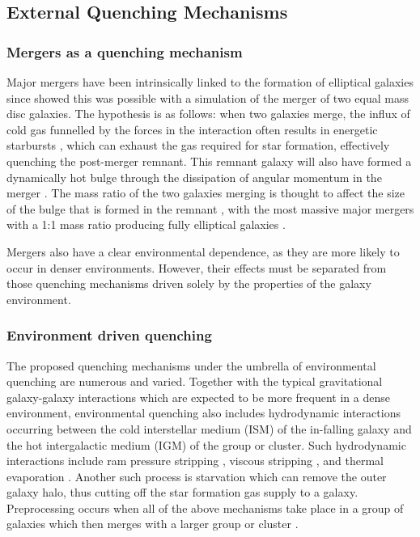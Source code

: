 \documentclass[useAMS,usenatbib]{mn2e}
\begin{document}
\subsection{External Quenching Mechanisms}\label{sec:extquench}

\subsubsection{Mergers as a quenching mechanism}\label{sec:mergersquench}

Major mergers have been intrinsically linked to the formation of elliptical galaxies since \citet{toomre72} showed this was possible with a simulation of the merger of two equal mass disc galaxies. The hypothesis is as follows: when two galaxies merge, the influx of cold gas funnelled by the forces in the interaction often results in energetic starbursts \citep{mihos94, mihos96, hopkins06d, hopkins08a, hopkins08b, snyder11, hayward14, sparre16}, which can exhaust the gas required for star formation, effectively quenching the post-merger remnant. This remnant galaxy will also have formed a dynamically hot bulge through the dissipation of angular momentum in the merger \citep{toomre77, walker96, kormendy04, hopkins11c, martig12}. The mass ratio of the two galaxies merging is thought to affect the size of the bulge that is formed in the remnant \citep{cox08, hopkins09c, tonini16}, with the most massive major mergers with a 1:1 mass ratio producing fully elliptical galaxies \citep{toomre72, barnes96, mihos96, kauffmann96, pontzen16}.

Mergers also have a clear environmental dependence, as they are more likely to occur in denser environments. However, their effects must be separated from those quenching mechanisms driven solely by the properties of the galaxy environment. 

\subsubsection{Environment driven quenching}\label{sec:envquench}

The proposed quenching mechanisms under the umbrella of environmental quenching are numerous and varied. Together with the typical gravitational galaxy-galaxy interactions \citep{moore96} which are expected to be more frequent in a dense environment, environmental quenching also includes hydrodynamic interactions occurring between the cold interstellar medium (ISM) of the in-falling galaxy and the hot intergalactic medium (IGM) of the group or cluster. Such hydrodynamic interactions include ram pressure stripping \citep{gunngott72}, viscous stripping \citep{nulsen82}, and thermal evaporation \citep[a rapid rise in temperature of the ISM due to contact with the IGM;][]{cowie77}. Another such process is starvation \citep[also called strangulation;][]{larson80} which can remove the outer galaxy halo, thus cutting off the star formation gas supply to a galaxy. Preprocessing occurs when all of the above mechanisms take place in a group of galaxies which then merges with a larger group or cluster \citep{dressler04}. 
\end{document}
